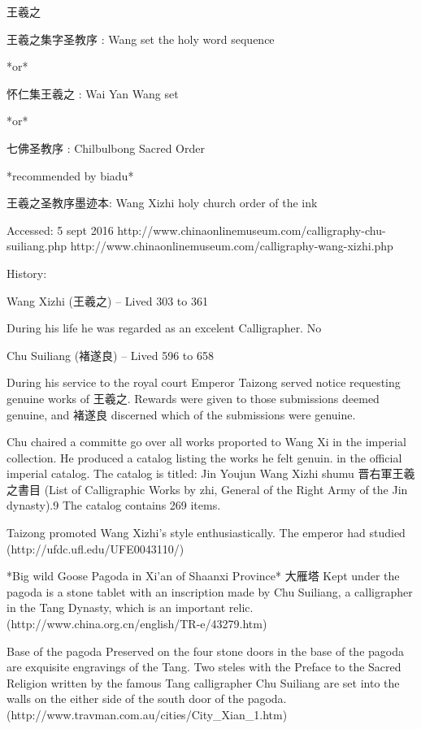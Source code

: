 王羲之

王羲之集字圣教序 : Wang set the holy word sequence

*or*

怀仁集王羲之 : Wai Yan Wang set

*or*

七佛圣教序 : Chilbulbong Sacred Order

*recommended by biadu*

王羲之圣教序墨迹本: Wang Xizhi holy church order of the ink

Accessed:  5 sept 2016
http://www.chinaonlinemuseum.com/calligraphy-chu-suiliang.php 
http://www.chinaonlinemuseum.com/calligraphy-wang-xizhi.php


History:

Wang Xizhi (王羲之) -- Lived 303 to 361

During his life he was regarded as an excelent Calligrapher.
No


Chu Suiliang (褚遂良) -- Lived 596 to 658

During his service to the royal court Emperor Taizong served notice requesting genuine works of 王羲之.  Rewards were given to those submissions deemed genuine, and 褚遂良 discerned which of the submissions were genuine.




Chu chaired a committe go over all works proported to Wang Xi in the imperial collection.  He produced a catalog listing the works he felt genuin. in the official imperial catalog.  The catalog is titled: 
Jin Youjun Wang Xizhi shumu 晋右軍王羲之書目 (List of Calligraphic Works by zhi, General of the Right Army of the Jin dynasty).9 The catalog contains 269 items.

Taizong promoted Wang Xizhi's style enthusiastically.  The emperor had studied 
(http://ufdc.ufl.edu/UFE0043110/)







*Big wild Goose Pagoda in Xi'an of Shaanxi Province* 大雁塔
Kept under the pagoda is a stone tablet with an inscription made by Chu Suiliang, a calligrapher in the Tang Dynasty, which is an important relic. (http://www.china.org.cn/english/TR-e/43279.htm)

Base of the pagoda
Preserved on the four stone doors in the base of the pagoda are exquisite engravings of the Tang. Two steles with the Preface to the Sacred Religion written by the famous Tang calligrapher Chu Suiliang are set into the walls on the either side of the south door of the pagoda. (http://www.travman.com.au/cities/City_Xian_1.htm)

